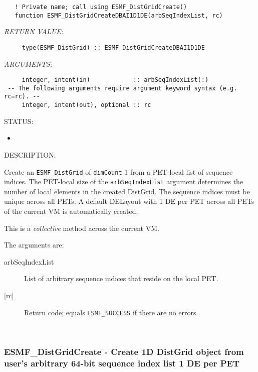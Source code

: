  
\begin{verbatim}   ! Private name; call using ESMF_DistGridCreate()
   function ESMF_DistGridCreateDBAI1D1DE(arbSeqIndexList, rc)
           \end{verbatim}{\em RETURN VALUE:}
\begin{verbatim}     type(ESMF_DistGrid) :: ESMF_DistGridCreateDBAI1D1DE\end{verbatim}{\em ARGUMENTS:}
\begin{verbatim}     integer, intent(in)            :: arbSeqIndexList(:)
 -- The following arguments require argument keyword syntax (e.g. rc=rc). --
     integer, intent(out), optional :: rc\end{verbatim}
{\sf STATUS:}
   \begin{itemize}
   \item{}
   \end{itemize}
  
{\sf DESCRIPTION:\\ }


       Create an {\tt ESMF\_DistGrid} of {\tt dimCount} 1 from a PET-local list
       of sequence indices. The PET-local size of the {\tt arbSeqIndexList}
       argument determines the number of local elements in the created DistGrid.
       The sequence indices must be unique across all PETs. A default
       DELayout with 1 DE per PET across all PETs of the current VM is 
       automatically created.
  
       This is a {\em collective} method across the current VM.
  
       The arguments are:
       \begin{description}
       \item[arbSeqIndexList]
            List of arbitrary sequence indices that reside on the local PET.
       \item[{[rc]}]
            Return code; equals {\tt ESMF\_SUCCESS} if there are no errors.
       \end{description}
   
 
\mbox{}\hrulefill\ 
 
\subsubsection [ESMF\_DistGridCreate] {ESMF\_DistGridCreate - Create 1D DistGrid object from user's arbitrary 64-bit sequence index list 1 DE per PET}


